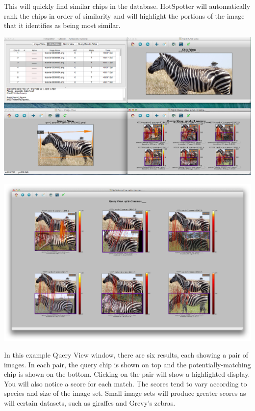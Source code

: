 \documentclass[a4paper,10pt]{article}
\begin{document}
\noindent
        This will quickly find similar chips in the database.  HotSpotter will
        automatically rank the chips in order of similarity and will highlight
        the portions of the image that it identifies as being most
        similar.

        \begin{center}
            \includegraphics[scale=0.2]{images/query-all.png}

        \;

            \includegraphics[scale=0.212]{images/query-result.png}
        \end{center}
        In this example Query View window, there are six results, each showing a pair of images.  In each
        pair, the query chip is shown on top and the
        potentially-matching chip is shown on the bottom.  Clicking on
        the pair will show a highlighted display.  You will also
        notice a score for each match.  The scores tend to vary according to species and size of the image set.  
	Small image sets will produce greater scores as will certain datasets, such as giraffes and Grevy's
        zebras. 
     
\end{document}
